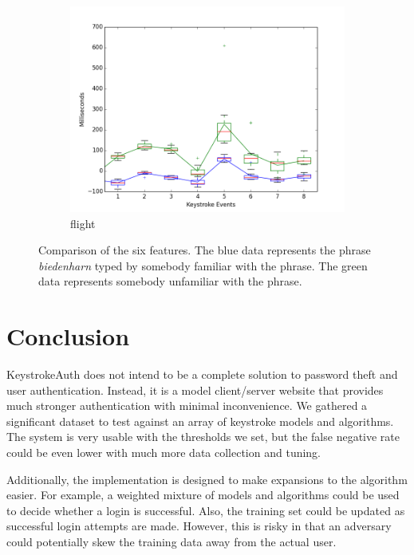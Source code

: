 \documentclass{article}
\begin{document}
\begin{figure}[H]
  \begin{subfigure}[b]{0.3\textwidth}
    \includegraphics[width=\textwidth]{biedenharn_jordan_flight_final.png}
    \caption{flight}
    \label{all_graphs:flight}
  \end{subfigure}
  \caption{Comparison of the six features. The blue data represents the phrase \textit{biedenharn} typed by somebody familiar with the phrase. The green data represents somebody unfamiliar with the phrase.}
  \label{all_graphs}
\end{figure}

\section{Conclusion}
KeystrokeAuth does not intend to be a complete solution to password theft and user authentication. Instead, it is a model client/server website that provides much stronger authentication with minimal inconvenience. We gathered a significant dataset to test against an array of keystroke models and algorithms. The system is very usable with the thresholds we set, but the false negative rate could be even lower with much more data collection and tuning.

Additionally, the implementation is designed to make expansions to the algorithm easier. For example, a weighted mixture of models and algorithms could be used to decide whether a login is successful. Also, the training set could be updated as successful login attempts are made. However, this is risky in that an adversary could potentially skew the training data away from the actual user.
\end{document}
